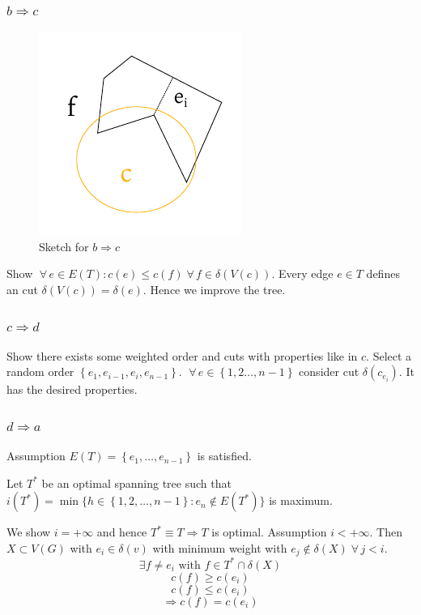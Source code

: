 \documentclass[a4paper]{article}
\theoremstyle{definition}
\newcommand{\set}[1]{\left\{#1\right\}}
\newcommand{\fall}{\;\forall\,}
\begin{document}
\subsubsection{$b \Rightarrow c$}
%
\begin{figure}[t]
  \begin{center}
    \includegraphics{img/bc.pdf}
    \caption{Sketch for $b \Rightarrow c$}
  \end{center}
\end{figure}

Show $\fall e \in E(T): c(e) \leq c(f) \fall f \in \delta(V(c))$. Every edge $e \in T$ defines an cut $\delta(V(c)) = \delta(e)$. Hence we improve the tree.

\subsubsection{$c \Rightarrow d$}
%
Show there exists some weighted order and cuts with properties like in $c$. Select a random order $\set{e_1, e_{i-1}, e_i, e_{n-1}}$. $\fall e \in \set{1, 2 \ldots, n-1}$ consider cut $\delta(c_{e_i})$. It has the desired properties.

\subsubsection{$d \Rightarrow a$}
%
Assumption $E(T) = \set{e_1, \ldots, e_{n-1}}$ is satisfied.

Let $T^*$ be an optimal spanning tree such that $i(T^*) = \min\{h \in \set{1, 2, \ldots, n-1}: e_n \notin E(T^*)\}$ is maximum.

We show $i = +\infty$ and hence $T^* \equiv T \Rightarrow T$ is optimal.
Assumption $i < +\infty$. Then $X \subset V(G)$ with $e_i \in \delta(v)$ with minimum weight with $e_j \notin \delta(X) \fall j < i$.
\[
  \exists f \neq e_i \text{ with } f \in T^* \cap \delta(X)
\] \[
  c(f) \geq c(e_i)
\] \[
  c(f) \leq c(e_i)
\] \[
  \Rightarrow c(f) = c(e_i)
\]
\end{document}
